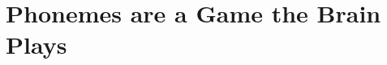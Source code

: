 
\maketitle
\clearpage



\tableofcontents%
%
\mainmatter

% 



% 



\chapter{Phonemes are a Game the Brain Plays}



% 


% 

% 


% 

\begin{fullwidth}



\end{fullwidth}